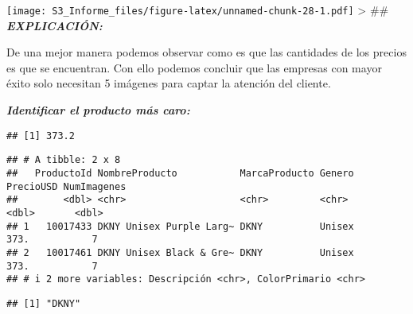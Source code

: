\documentclass[
]{article}
\newenvironment{Shaded}{\begin{snugshade}}{\end{snugshade}}
\newcommand{\FunctionTok}[1]{\textcolor[rgb]{0.00,0.00,0.00}{#1}}
\newcommand{\NormalTok}[1]{#1}
\newcommand{\OtherTok}[1]{\textcolor[rgb]{0.56,0.35,0.01}{#1}}
\newcommand{\SpecialCharTok}[1]{\textcolor[rgb]{0.00,0.00,0.00}{#1}}
\begin{document}
\texttt{[image: S3\_Informe\_files/figure-latex/unnamed-chunk-28-1.pdf]}
\textgreater{} \#\# \textbf{\emph{EXPLICACIÓN:}}

De una mejor manera podemos observar como es que las cantidades de los
precios es que se encuentran. Con ello podemos concluir que las empresas
con mayor éxito solo necesitan 5 imágenes para captar la atención del
cliente.

\textbf{\emph{Identificar el producto más caro:}}

\begin{Shaded}
\end{Shaded}

\begin{verbatim}
## [1] 373.2
\end{verbatim}

\begin{Shaded}
\end{Shaded}

\begin{verbatim}
## # A tibble: 2 x 8
##   ProductoId NombreProducto           MarcaProducto Genero PrecioUSD NumImagenes
##        <dbl> <chr>                    <chr>         <chr>      <dbl>       <dbl>
## 1   10017433 DKNY Unisex Purple Larg~ DKNY          Unisex      373.           7
## 2   10017461 DKNY Unisex Black & Gre~ DKNY          Unisex      373.           7
## # i 2 more variables: Descripción <chr>, ColorPrimario <chr>
\end{verbatim}

\begin{Shaded}
\end{Shaded}

\begin{verbatim}
## [1] "DKNY"
\end{verbatim}
\end{document}

